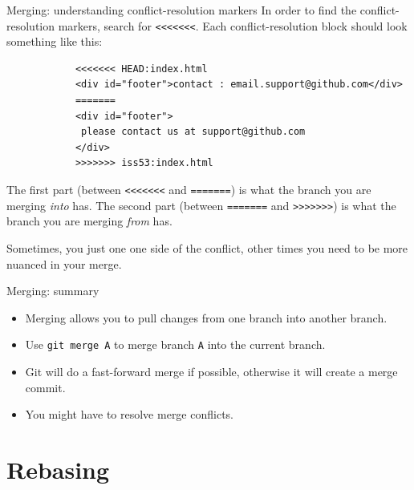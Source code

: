 \documentclass{beeper}
\begin{document}
\begin{frame}[fragile]{Merging: understanding conflict-resolution markers}
    In order to find the conflict-resolution markers, search for
    \texttt{<<<<<<<}. Each conflict-resolution block should look something like
    this:
    {
        \tiny
        \begin{verbatim}
            <<<<<<< HEAD:index.html
            <div id="footer">contact : email.support@github.com</div>
            =======
            <div id="footer">
             please contact us at support@github.com
            </div>
            >>>>>>> iss53:index.html
        \end{verbatim}
    }

    The first part (between \texttt{<<<<<<<} and \texttt{=======}) is what the
    branch you are merging \textit{into} has. The second part (between
    \texttt{=======} and \texttt{>>>>>>>}) is what the branch you are merging
    \textit{from} has.
    \pause

    Sometimes, you just one one side of the conflict, other times you need to be
    more nuanced in your merge.
\end{frame}

\begin{frame}{Merging: summary}
    \begin{itemize}
        \item Merging allows you to pull changes from one branch into another
            branch.
        \item Use \texttt{git merge A} to merge branch \texttt{A} into the
            current branch.
        \item Git will do a fast-forward merge if possible, otherwise it will
            create a merge commit.
        \item You might have to resolve merge conflicts.
    \end{itemize}
\end{frame}

\section{Rebasing}
\end{document}
